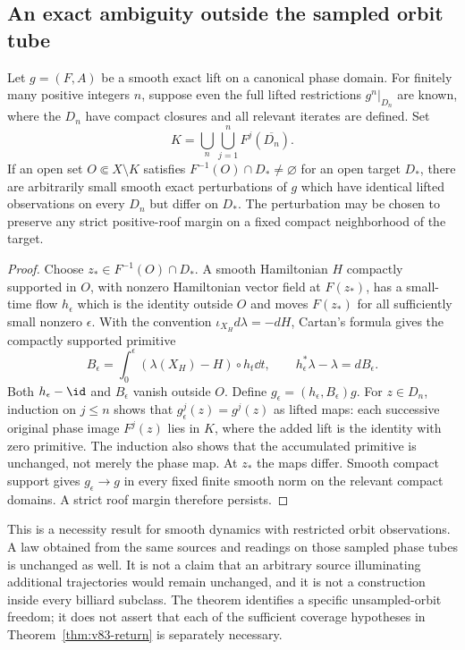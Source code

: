 \subsection{An exact ambiguity outside the sampled orbit tube}

\begin{theorem}
\label{thm:v83-unobserved}
Let $g=(F,A)$ be a smooth exact lift on a canonical phase domain.
For finitely many positive integers $n$, suppose even the full lifted
restrictions $g^n|_{D_n}$ are known, where the $D_n$ have compact
closures and all relevant iterates are defined. Set
\[
       K=\bigcup_n\bigcup_{j=1}^n F^j(\overline{D_n}).
\]
If an open set $O\Subset X\setminus K$ satisfies
$F^{-1}(O)\cap D_*\ne\varnothing$ for an open target $D_*$,
there are arbitrarily small smooth exact perturbations of $g$ which
have identical lifted observations on every $D_n$ but differ on $D_*$.
The perturbation may be chosen to preserve any strict positive-roof
margin on a fixed compact neighborhood of the target.
\end{theorem}
\begin{proof}
Choose $z_*\in F^{-1}(O)\cap D_*$. A smooth Hamiltonian $H$
compactly supported in $O$, with nonzero Hamiltonian vector field at
$F(z_*)$, has a small-time flow $h_\epsilon$ which is the identity
outside $O$ and moves $F(z_*)$ for all sufficiently small nonzero
$\epsilon$. With the convention
$\iota_{X_H}d\lambda=-dH$, Cartan's formula gives the compactly
supported primitive
\[
 B_\epsilon=\int_0^\epsilon
           (\lambda(X_H)-H)\circ h_t\dd t,
 \qquad h_\epsilon^*\lambda-\lambda=dB_\epsilon.
\]
Both $h_\epsilon-\id$ and $B_\epsilon$ vanish outside $O$.
Define $g_\epsilon=(h_\epsilon,B_\epsilon)g$.
For $z\in D_n$, induction on $j\le n$ shows that
$g_\epsilon^j(z)=g^j(z)$ as lifted maps: each successive original
phase image $F^j(z)$ lies in $K$, where the added lift is the identity
with zero primitive. The induction also shows that the accumulated
primitive is unchanged, not merely the phase map. At $z_*$ the maps
differ. Smooth compact support gives $g_\epsilon\to g$ in every
fixed finite smooth norm on the relevant compact domains. A strict
roof margin therefore persists.
\end{proof}

This is a necessity result for smooth dynamics with restricted orbit
observations. A law obtained from the same sources and readings on
those sampled phase tubes is unchanged as well. It is not a claim
that an arbitrary source illuminating additional trajectories would
remain unchanged, and it is not a construction inside every billiard
subclass. The theorem identifies a specific unsampled-orbit freedom;
it does not assert that each of the sufficient coverage hypotheses
in Theorem~\ref{thm:v83-return} is separately necessary.

